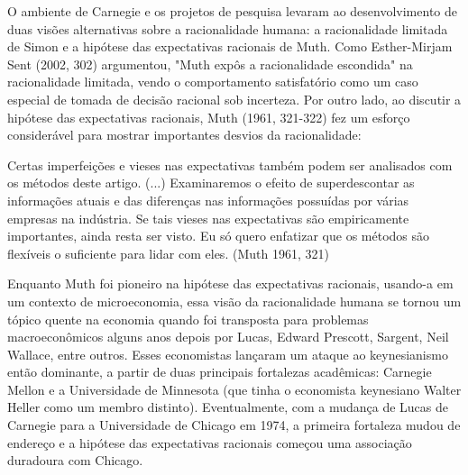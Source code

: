 \documentclass[a4paper,12pt]{article}[abntex2]
\begin{document}
O ambiente de Carnegie e os projetos de pesquisa levaram ao desenvolvimento de duas visões alternativas sobre a racionalidade humana: a racionalidade limitada de Simon e a hipótese das expectativas racionais de Muth. Como Esther-Mirjam Sent (2002, 302) argumentou, "Muth expôs a racionalidade escondida" na racionalidade limitada, vendo o comportamento satisfatório como um caso especial de tomada de decisão racional sob incerteza. Por outro lado, ao discutir a hipótese das expectativas racionais, Muth (1961, 321-322) fez um esforço considerável para mostrar importantes desvios da racionalidade:

Certas imperfeições e vieses nas expectativas também podem ser analisados com os métodos deste artigo. (...) Examinaremos o efeito de superdescontar as informações atuais e das diferenças nas informações possuídas por várias empresas na indústria. Se tais vieses nas expectativas são empiricamente importantes, ainda resta ser visto. Eu só quero enfatizar que os métodos são flexíveis o suficiente para lidar com eles. (Muth 1961, 321)

Enquanto Muth foi pioneiro na hipótese das expectativas racionais, usando-a em um contexto de microeconomia, essa visão da racionalidade humana se tornou um tópico quente na economia quando foi transposta para problemas macroeconômicos alguns anos depois por Lucas, Edward Prescott, Sargent, Neil Wallace, entre outros. Esses economistas lançaram um ataque ao keynesianismo então dominante, a partir de duas principais fortalezas acadêmicas: Carnegie Mellon e a Universidade de Minnesota (que tinha o economista keynesiano Walter Heller como um membro distinto). Eventualmente, com a mudança de Lucas de Carnegie para a Universidade de Chicago em 1974, a primeira fortaleza mudou de endereço e a hipótese das expectativas racionais começou uma associação duradoura com Chicago.
\end{document}
